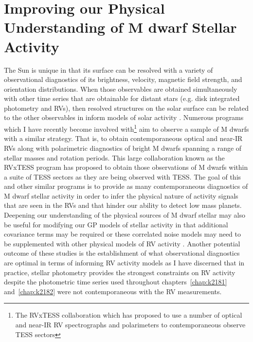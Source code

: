 \section{Improving our Physical Understanding of M dwarf Stellar Activity}
The Sun is unique in that its surface can be resolved with a variety of
observational diagnostics of its brightness, velocity, magnetic field strength,
and orientation distributions. When those observables are obtained
simultaneously with other time series that are obtainable for distant stars
(e.g. disk integrated photometry and RVs), then resolved structures on the solar
surface can be related to the other observables in inform models of solar
activity \citep{dumusque15,haywood16}. Numerous programs which I have recently
become involved with\footnote{The RVxTESS collaboration which has proposed
  to use a number of optical and near-IR RV spectrographs and polarimeters to
contemporaneous observe TESS sectors } aim to observe a sample of M dwarfs with a similar
strategy. That is, to obtain contemporaneous optical and near-IR RVs along with
polarimetric diagnostics of bright M dwarfs spanning a range of stellar masses
and rotation periods. This large collaboration known as the RVxTESS program
has proposed to obtain those observations of M dwarfs within a suite of TESS
sectors as they are being observed with TESS. The goal of this and other
similar programs is to provide as many contemporaneous diagnostics of M dwarf
stellar activity in order to infer the physical nature of activity signals that
are seen in the RVs and that hinder our ability to detect low mass planets. \\

Deepening our understanding of the physical sources of M dwarf stellar may also
be useful for modifying our GP models of stellar activity in that additional
covariance terms may be required or these correlated noise models may need to
be supplemented with other physical models of RV activity
\citep{aigrain12,haywood14}. Another potential
outcome of these studies is the establishment of what observational diagnostics
are optimal in terms of informing RV activity models as I have discerned that
in practice, stellar photometry provides the strongest constraints on RV
activity despite the photometric time series used throughout
chapters~\ref{chap:k2181} and~\ref{chap:k2182} were not contemporaneous with
the RV measurements.


